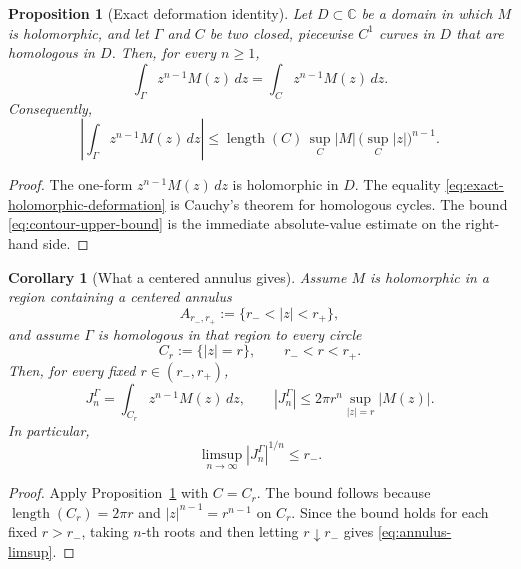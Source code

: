 \documentclass[11pt]{article}
\newtheorem{proposition}[theorem]{Proposition}
\newtheorem{corollary}[theorem]{Corollary}
\newcommand{\C}{\mathbb C}
\newcommand{\dd}{\,d}
\newcommand{\1}{\mathbf 1}
\begin{document}
\begin{proposition}[Exact deformation identity]\label{prop:exact-deformation}
Let \(D\subset\C\) be a domain in which \(M\) is holomorphic, and let \(\Gamma\) and
\(C\) be two closed, piecewise \(C^1\) curves in \(D\) that are homologous in \(D\). Then,
for every \(n\ge1\),
\begin{equation}\label{eq:exact-holomorphic-deformation}
  \int_\Gamma z^{n-1}M(z)\dd z
  =
  \int_C z^{n-1}M(z)\dd z.
\end{equation}
Consequently,
\begin{equation}\label{eq:contour-upper-bound}
  \left|\int_\Gamma z^{n-1}M(z)\dd z\right|
  \le
  \operatorname{length}(C)\,\sup_C|M|\,\bigl(\sup_C|z|\bigr)^{n-1}.
\end{equation}
\end{proposition}

\begin{proof}
The one-form \(z^{n-1}M(z)\dd z\) is holomorphic in \(D\). The equality
\eqref{eq:exact-holomorphic-deformation} is Cauchy's theorem for homologous cycles. The
bound \eqref{eq:contour-upper-bound} is the immediate absolute-value estimate on the
right-hand side.
\end{proof}

\begin{corollary}[What a centered annulus gives]\label{cor:centered-annulus-bound}
Assume \(M\) is holomorphic in a region containing a centered annulus
\[
  A_{r_-,r_+}:=\{r_-<|z|<r_+\},
\]
and assume \(\Gamma\) is homologous in that region to every circle
\[
  C_r:=\{|z|=r\},\qquad r_-<r<r_+.
\]
Then, for every fixed \(r\in(r_-,r_+)\),
\begin{equation}\label{eq:annulus-bound-fixed-r}
  J_n^\Gamma
  =
  \int_{C_r} z^{n-1}M(z)\dd z,
  \qquad
  |J_n^\Gamma|
  \le
  2\pi r^n\sup_{|z|=r}|M(z)|.
\end{equation}
In particular,
\begin{equation}\label{eq:annulus-limsup}
  \limsup_{n\to\infty}|J_n^\Gamma|^{1/n}\le r_-.
\end{equation}
\end{corollary}

\begin{proof}
Apply Proposition~\ref{prop:exact-deformation} with \(C=C_r\). The bound follows because
\(\operatorname{length}(C_r)=2\pi r\) and \(|z|^{n-1}=r^{n-1}\) on \(C_r\). Since the
bound holds for each fixed \(r>r_-\), taking \(n\)-th roots and then letting
\(r\downarrow r_-\) gives \eqref{eq:annulus-limsup}.
\end{proof}
\end{document}
